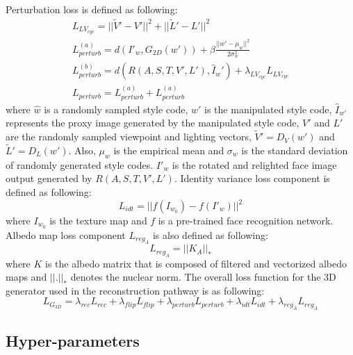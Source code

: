 Perturbation loss is defined as following:
\begin{gather}
    L_{LV_{cyc}} = || \tilde{V}' - V' ||^2  + || \tilde{L}'  - L' ||^2 \\
    L^{(a)}_{perturb} = d(I'_w, G_{2D}(w')) + \beta \frac{{||w'- \mu_w||}^2}{2\sigma^2_w} \\
    L^{(b)}_{perturb} = d(R(A,S,T,V',L'), \hat{I}_w') + \lambda_{LV_{cyc}}L_{LV_{cyc}} \\
    L_{perturb} = L^{(a)}_{perturb} +  L^{(a)}_{perturb}
\end{gather}
where $\hat{w}$ is a randomly sampled style code, $w'$ is the manipulated style code,
$\hat{I}_{w'}$ represents the proxy image generated by the manipulated style code,
$V'$ and $L'$ are the randomly sampled viewpoint and lighting vectors, $\tilde{V}' = D_V(w')$ and $\tilde{L}' = D_L(w')$. Also, $\mu_w$ is the empirical mean and $\sigma_w$ is the standard deviation of randomly generated style codes. $I'_w$ is the rotated and relighted
face image output generated by $R(A, S, T, V', L')$. Identity variance loss component is defined as following:
\begin{equation}
    L_{idt} = || f(I_{w_0}) - f(I'_w)||^2
\end{equation}
where $I_{w_0}$ is the texture map and $f$ is a pre-trained face recognition network. Albedo map loss component $L_{reg_A}$ is also defined as following:
\begin{equation}
L_{reg_A} = || K_A ||_*
\end{equation}
where $K$ is the albedo matrix that is composed of filtered and vectorized albedo maps and $||.||_*$ denotes the nuclear norm. The overall loss function for the 3D generator used in the reconstruction pathway is as following:
\begin{equation}
L_{G_{3D}} = \lambda_{rec} L_{rec} + \lambda_{flip} L_{flip} + \lambda_{perturb} L_{perturb} + \lambda_{idt} L_{idt} +  \lambda_{reg_A} L_{reg_A}
\end{equation}


\subsection{Hyper-parameters}

